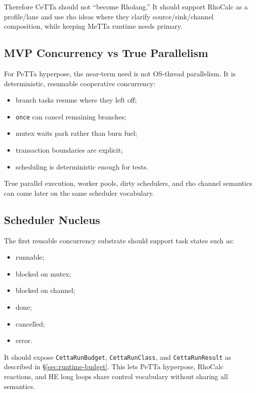 \documentclass[11pt]{article}
\newcommand{\CeTTa}{CeTTa}
\newcommand{\MeTTa}{MeTTa}
\newcommand{\PeTTa}{PeTTa}
\newcommand{\RhoCalc}{RhoCalc}
\newcommand{\RunBudget}{\texttt{CettaRunBudget}}
\newcommand{\RunClass}{\texttt{CettaRunClass}}
\newcommand{\RunResult}{\texttt{CettaRunResult}}
\begin{document}
Therefore \CeTTa{} should not ``become Rholang.''  It should support \RhoCalc{} as a profile/lane and use rho ideas where they clarify source/sink/channel composition, while keeping \MeTTa{} runtime needs primary.

\subsection{MVP Concurrency vs True Parallelism}

For \PeTTa{} hyperpose, the near-term need is not OS-thread parallelism.  It is deterministic, resumable cooperative concurrency:

\begin{itemize}[leftmargin=*]
  \item branch tasks resume where they left off;
  \item \texttt{once} can cancel remaining branches;
  \item mutex waits park rather than burn fuel;
  \item transaction boundaries are explicit;
  \item scheduling is deterministic enough for tests.
\end{itemize}

True parallel execution, worker pools, dirty schedulers, and rho channel semantics can come later on the same scheduler vocabulary.

\subsection{Scheduler Nucleus}

The first reusable concurrency substrate should support task states such as:

\begin{itemize}[leftmargin=*]
  \item runnable;
  \item blocked on mutex;
  \item blocked on channel;
  \item done;
  \item cancelled;
  \item error.
\end{itemize}

It should expose \RunBudget{}, \RunClass{}, and \RunResult{} as described in \S\ref{sec:runtime-budget}.  This lets \PeTTa{} hyperpose, \RhoCalc{} reactions, and HE long loops share control vocabulary without sharing all semantics.
\end{document}
